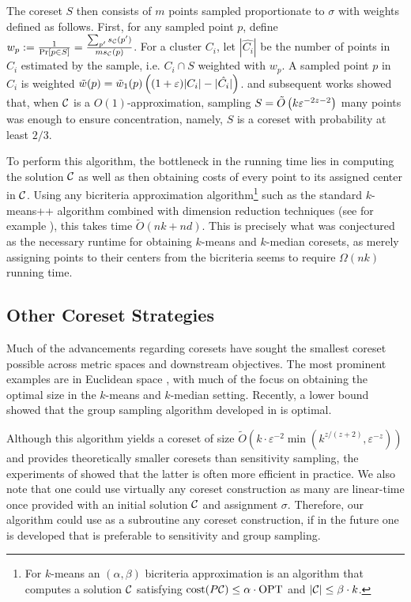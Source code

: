 The coreset $S$ then consists of $m$ points sampled proportionate to $\sigma$ with weights defined as follows. First, for any sampled point $p$, define $w_p :=
\frac{1}{\Pr[p \in S]} = \frac{\sum_{p'} s_\mathcal C(p')}{m s_\mathcal C(p)}$. For a cluster $C_i$, let $|\hat{C_i}|$ be the number of points in $C_i$ estimated by the
sample, i.e. $C_i \cap S$ weighted with $w_p$. A sampled point $p$ in $C_i$ is
weighted $\tilde w(p) = \tilde w_1(p) \left( (1+\varepsilon)|C_i| - |\hat{C_i}|\right)$.  \cite{FeldmanL11} and subsequent works showed that, when $\mathcal C$ is
a $O(1)$-approximation, sampling $S = \tilde O\left( k \varepsilon^{-2z-2}\right)$ many points was enough to ensure concentration, namely, $S$ is a coreset with
probability at least $2/3$.

To perform this algorithm, the bottleneck in the running time lies in computing the solution $\mathcal C$ as well as then obtaining costs of every point to its
assigned center in $\mathcal C$. Using any bicriteria approximation algorithm\footnote{For $k$-means an $(\alpha,\beta)$ bicriteria approximation is an algorithm
that computes a solution $\mathcal C$ satisfying $\operatorname{cost}(P\mathcal C)\leq \alpha\cdot \text{OPT}$ and $|\mathcal C|\leq \beta\cdot k$.} such as the standard $k$-means++ algorithm
\cite{ArV07} combined with dimension reduction techniques (see for example \cite{BecchettiBC0S19,CohenEMMP15,MakarychevMR19}), this takes time $\tilde O(nk
+nd)$. This is precisely what was conjectured as the necessary runtime for obtaining $k$-means and $k$-median coresets, as merely assigning points to their
centers from the bicriteria seems to require $\Omega(nk)$ running time.



\subsection{Other Coreset Strategies}
\label{ssec:clustering_prelim}

Much of the advancements regarding coresets have sought the smallest coreset possible across metric spaces and downstream objectives. The most prominent
examples are in Euclidean space \cite{BadoiuHI02, HaM04, Chen09, HuangV20, stoc22}, with much of the focus on obtaining the optimal size in the $k$-means and
$k$-median setting. Recently, a lower bound \cite{huangLB} showed that the group sampling algorithm developed in \cite{stoc21, stoc22} is optimal.

Although this algorithm yields a coreset of size $\tilde{O}(k\cdot \varepsilon^{-2}
\min(k^{z/(z+2)},\varepsilon^{-z}))$ \cite{CLSSS22} and provides theoretically smaller coresets than sensitivity sampling, the experiments of \cite{chrisESA}
showed that the latter is often more efficient in practice. We also note that one could use virtually any coreset construction as many are linear-time once
provided with an initial solution $\mathcal C$ and assignment $\sigma$.  Therefore, our algorithm could use as a subroutine any coreset construction, if in the
future one is developed that is preferable to sensitivity and group sampling.

